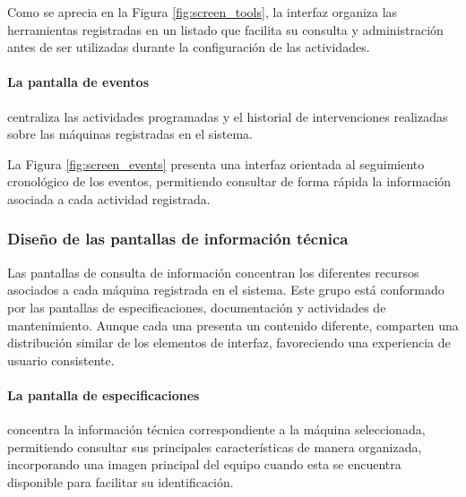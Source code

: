                 

                Como se aprecia en la Figura \ref{fig:screen_tools}, la interfaz organiza las herramientas registradas en un listado que facilita su consulta y administración antes de ser utilizadas durante la configuración de las actividades.

            \paragraph{La pantalla de eventos}

                centraliza las actividades programadas y el historial de intervenciones realizadas sobre las máquinas registradas en el sistema.

                

                La Figura \ref{fig:screen_events} presenta una interfaz orientada al seguimiento cronológico de los eventos, permitiendo consultar de forma rápida la información asociada a cada actividad registrada.

        \subsubsection{Diseño de las pantallas de información técnica}

            Las pantallas de consulta de información concentran los diferentes recursos asociados a cada máquina registrada en el sistema. Este grupo está conformado por las pantallas de especificaciones, documentación y actividades de mantenimiento. Aunque cada una presenta un contenido diferente, comparten una distribución similar de los elementos de interfaz, favoreciendo una experiencia de usuario consistente.

            \paragraph{La pantalla de especificaciones}

                concentra la información técnica correspondiente a la máquina seleccionada, permitiendo consultar sus principales características de manera organizada, incorporando una imagen principal del equipo cuando esta se encuentra disponible para facilitar su identificación.

                

